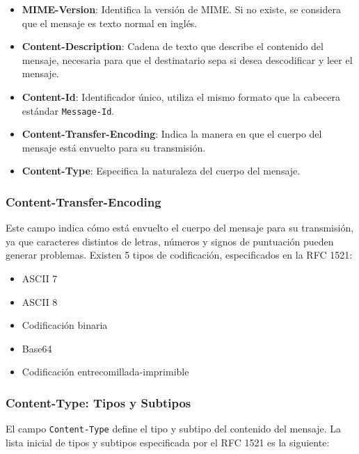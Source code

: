 \documentclass[a4paper,12pt]{article}
\begin{document}
\begin{itemize}
    \item \textbf{MIME-Version}: Identifica la versión de MIME. Si no existe, se considera que el mensaje es texto normal en inglés.
    \item \textbf{Content-Description}: Cadena de texto que describe el contenido del mensaje, necesaria para que el destinatario sepa si desea descodificar y leer el mensaje.
    \item \textbf{Content-Id}: Identificador único, utiliza el mismo formato que la cabecera estándar \texttt{Message-Id}.
    \item \textbf{Content-Transfer-Encoding}: Indica la manera en que el cuerpo del mensaje está envuelto para su transmisión.
    \item \textbf{Content-Type}: Especifica la naturaleza del cuerpo del mensaje.
\end{itemize}

\subsubsection{Content-Transfer-Encoding}
Este campo indica cómo está envuelto el cuerpo del mensaje para su transmisión, ya que caracteres distintos de letras, números y signos de puntuación pueden generar problemas. Existen 5 tipos de codificación, especificados en la RFC 1521:

\begin{itemize}
    \item ASCII 7
    \item ASCII 8
    \item Codificación binaria
    \item Base64
    \item Codificación entrecomillada-imprimible
\end{itemize}

\subsubsection{Content-Type: Tipos y Subtipos}
El campo \texttt{Content-Type} define el tipo y subtipo del contenido del mensaje. La lista inicial de tipos y subtipos especificada por el RFC 1521 es la siguiente:
\end{document}
